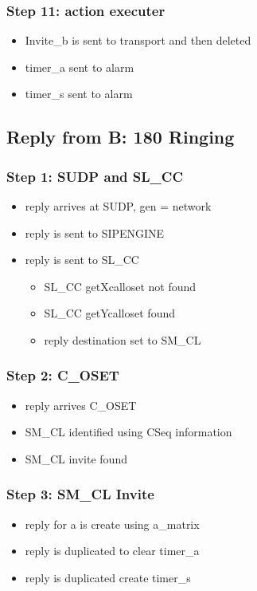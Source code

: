 \documentclass[a4paper]{report}
\begin{document}
\subsubsection{Step 11: action executer} 
\begin{itemize}
   \item Invite\_b is sent to transport and then deleted
   \item timer\_a sent to alarm
   \item timer\_s sent to alarm
\end{itemize}

\subsection{Reply from B: 180 Ringing}

\subsubsection{Step 1: SUDP and SL\_CC} 
\begin{itemize}
   \item reply arrives at SUDP, gen = network
   \item reply is sent to SIPENGINE
   \item reply is sent to SL\_CC
   \begin{itemize}
     \item SL\_CC getXcalloset not found
     \item SL\_CC getYcalloset found
     \item reply destination set to SM\_CL
   \end{itemize}  
\end{itemize}

\subsubsection{Step 2: C\_OSET} 
\begin{itemize}
   \item reply arrives C\_OSET
   \item SM\_CL identified using CSeq information
   \item SM\_CL invite found
 \end{itemize}  
 
 \subsubsection{Step 3: SM\_CL Invite} 
\begin{itemize}
   \item reply for a is create using a\_matrix
   \item reply is duplicated to clear timer\_a
   \item reply is duplicated create timer\_s 
 \end{itemize} 
\end{document}
